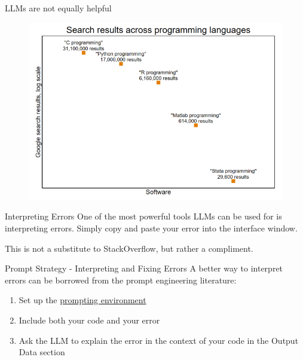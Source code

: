 \documentclass[
	11pt, %
	aspectratio=169, %
]{beamer}
\begin{document}
\begin{frame}{LLMs are not equally helpful}
    \begin{figure}
        \centering
        \includegraphics{Availability of Results on Internet.png}
    \end{figure}
\end{frame}
\begin{frame}{Interpreting Errors}
    One of the most powerful tools LLMs can be used for is interpreting errors. Simply copy and paste your error into the interface window.

    \vspace{20pt} 
    This is not a substitute to StackOverflow, but rather a compliment.
\end{frame}
\begin{frame}{Prompt Strategy - Interpreting and Fixing Errors}
    A better way to interpret errors can be borrowed from the \alert{prompt engineering} literature:
    \begin{enumerate}
        \setlength{\itemsep}{20pt}
        \item Set up the \hyperlink{Prompt Structure}{prompting environment}
        \item Include both your code and your error
        \item Ask the LLM to explain the error in the context of your code in the \alert{Output Data} section
    \end{enumerate}
\end{frame}
\end{document}
